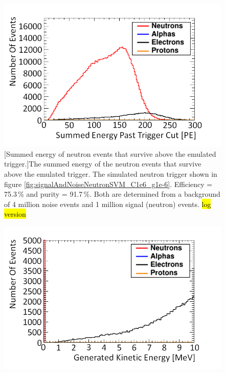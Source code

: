 \begin{figure}[!h]
\centering
\begin{minipage}{.45\textwidth}
  \centering
  \includegraphics[width=\linewidth]{Chapter4/Figs/Raster/summedEnergyPastTriggerGdDiceboxMedText.png}
  [Summed energy of neutron events that survive above the emulated trigger.]{The summed energy of the neutron events that survive above the emulated trigger. The simulated neutron trigger shown in figure \ref{fig:signalAndNoiseNeutronSVM_C1e6_g1e-6}. Efficiency = 75.3\,\% and purity = 91.7\,\%. Both are determined from a background of 4 million noise events and 1 million signal (neutron) events. \hl{log version}} 
  \label{fig:summedEnergyPastTriggerGdDicebox}
    \vspace{0.956cm} %
\end{minipage}%
\qquad
\begin{minipage}{.45\textwidth}
  \centering
  \includegraphics[width=\linewidth]{Chapter4/Figs/Raster/GeneratedEnergyPastTriggerGdDiceboxMedText.png}

\end{minipage}
\end{figure}
